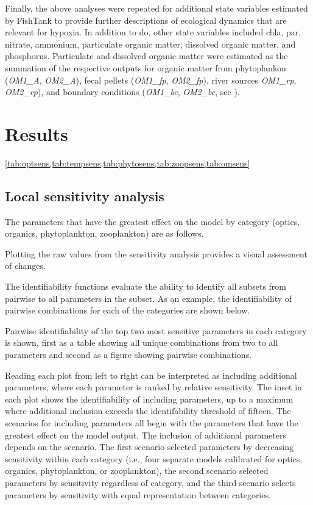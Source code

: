\documentclass[letterpaper,12pt,oneside]{article}\usepackage[]{graphicx}\usepackage[]{color}
\begin{document}
Finally, the above analyses were repeated for additional state variables estimated by FishTank to provide further descriptions of ecological dynamics that are relevant for hypoxia.  In addition to \ac{do}, other state variables included \ac{chla}, \ac{par}, nitrate, ammonium, particulate organic matter, dissolved organic matter, and phosphorus.  Particulate and dissolved organic matter were estimated as the summation of the respective outputs for organic matter from phytoplankon (\textit{OM1\_A}, \textit{OM2\_A}), fecal pellets (\textit{OM1\_fp}, \textit{OM2\_fp}), river sources \textit{OM1\_rp}, \textit{OM2\_rp}), and boundary conditions (\textit{OM1\_bc}, \textit{OM2\_bc}, see ). 

\section{Results}

\cref{tab:optsens,tab:tempsens,tab:phytosens,tab:zoopsens,tab:omsens}

\subsection{Local sensitivity analysis}

The parameters that have the greatest effect on the model by category (optics, organics, phytoplankton, zooplankton) are as follows.

Plotting the raw values from the sensitivity analysis provides a visual assessment of changes.

The identifiability functions evaluate the ability to identify all subsets from pairwise to all parameters in the subset.  As an example, the identifiability of pairwise combinations for each of the categories are shown below.

Pairwise identifiability of the top two most sensitive parameters in each category is shown, first as a table showing all unique combinations from two to all parameters and second as a figure showing pairwise combinations.

Reading each plot from left to right can be interpreted as including additional parameters, where each parameter is ranked by relative sensitivity.  The inset in each plot shows the identifiability of including parameters, up to a maximum where additional inclusion exceeds the identifability threshold of fifteen.  The scenarios for including parameters all begin with the parameters that have the greatest effect on the model output.  The inclusion of additional parameters depends on the scenario.  The first scenario selected parameters by decreasing sensitivity within each category (i.e., four separate models calibrated for optics, organics, phytoplankton, or zooplankton), the second scenario selected parameters by sensitivity regardless of category, and the third scenario selects parameters by sensitivity with equal representation between categories. 
\end{document}
